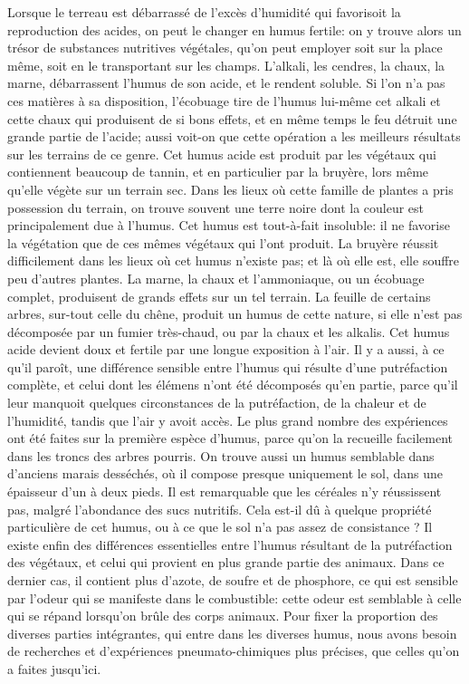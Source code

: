 Lorsque le terreau est débarrassé de l'excès d'humidité qui favorisoit la reproduction des acides, on peut le changer en humus fertile: on y trouve alors un trésor de substances nutritives végétales, qu'on peut employer soit sur la place même, soit en le transportant sur les champs. L'alkali, les cendres, la chaux, la marne, débarrassent l'humus de son acide, et le rendent soluble. Si l'on n'a pas ces matières à sa disposition, l'écobuage tire de l'humus lui-même cet alkali et cette chaux qui produisent de si bons effets, et en même temps le feu détruit une grande partie de l'acide; aussi voit-on que cette opération a les meilleurs résultats sur les terrains de ce genre.
Cet humus acide est produit par les végétaux qui contiennent beaucoup de tannin, et en particulier par la bruyère, lors même qu'elle végète sur un terrain sec. Dans les lieux où cette famille de plantes a pris possession du terrain, on trouve souvent une terre noire dont la couleur est principalement due à l'humus. Cet humus est tout-à-fait insoluble: il ne favorise la végétation que de ces mêmes végétaux qui l'ont produit. La bruyère réussit difficilement dans\setcounter{page}{71} les lieux où cet humus n'existe pas; et là où elle est, elle souffre peu d'autres plantes. La marne, la chaux et l'ammoniaque, ou un écobuage complet, produisent de grands effets sur un tel terrain.
La feuille de certains arbres, sur-tout celle du chêne, produit un humus de cette nature, si elle n'est pas décomposée par un fumier très-chaud, ou par la chaux et les alkalis. Cet humus acide devient doux et fertile par une longue exposition à l'air.
Il y a aussi, à ce qu'il paroît, une différence sensible entre l'humus qui résulte d'une putréfaction complète, et celui dont les élémens n'ont été décomposés qu'en partie, parce qu'il leur manquoit quelques circonstances de la putréfaction, de la chaleur et de l'humidité, tandis que l'air y avoit accès. Le plus grand nombre des expériences ont été faites sur la première espèce d'humus, parce qu'on la recueille facilement dans les troncs des arbres pourris. On trouve aussi un humus semblable dans d'anciens marais desséchés, où il compose presque uniquement le sol, dans une épaisseur d'un à deux pieds. Il est remarquable que les céréales n'y réussissent pas, malgré l'abondance des sucs nutritifs. Cela est-il dû à\setcounter{page}{72} quelque propriété particulière de cet humus, ou à ce que le sol n'a pas assez de consistance ?
Il existe enfin des différences essentielles entre l'humus résultant de la putréfaction des végétaux, et celui qui provient en plus grande partie des animaux. Dans ce dernier cas, il contient plus d'azote, de soufre et de phosphore, ce qui est sensible par l'odeur qui se manifeste dans le combustible: cette odeur est semblable à celle qui se répand lorsqu'on brûle des corps animaux. Pour fixer la proportion des diverses parties intégrantes, qui entre dans les diverses humus, nous avons besoin de recherches et d'expériences pneumato-chimiques plus précises, que celles qu'on a faites jusqu'ici.
